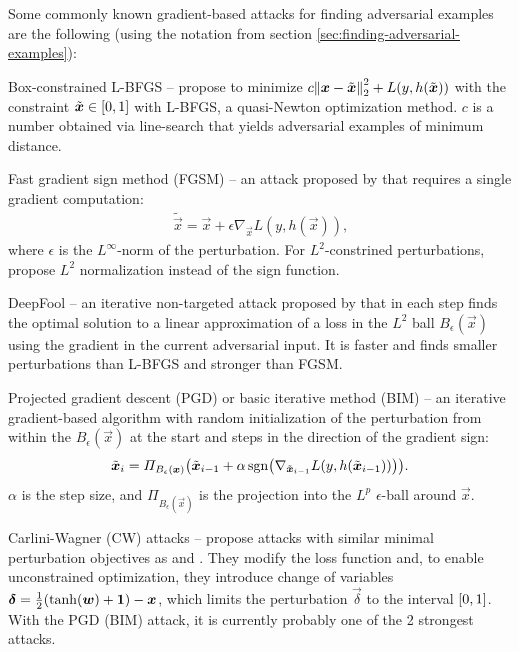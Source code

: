 \documentclass[conference,compsoc]{IEEEtran}
\begin{document}
Some commonly known gradient-based attacks for finding adversarial examples are the following (using the notation from section \ref{sec:finding-adversarial-examples}):
\begin{soliditemize}
	\item Box-constrained L-BFGS -- \citet{Szegedy:2013:IPNN} propose to minimize $c\enVert{\vec x -\tilde{\vec x}}_2^2+L(y,h(\tilde{\vec x}))$ with the constraint $\tilde{\vec x}\in\intcc{0,1}$ with L-BFGS, a quasi-Newton optimization method. $c$ is a number obtained via line-search that yields adversarial examples of minimum distance.
	\item Fast gradient sign method (FGSM) -- an attack proposed by \citet{Goodfellow:2014:EHAE} that requires a single gradient computation:
	\begin{align}
	\tilde{\vec x} = \vec x + \epsilon\nabla_{\vec x} L(y,h(\vec x)) \text{,}
	\end{align} 
	where $\epsilon$ is the $L^\infty$-norm of the perturbation. For $L^2$-constrined perturbations, \citet{Miyato:2017:VATRMSSSL} propose $L^2$ normalization instead of the sign function.
	\item DeepFool -- an iterative non-targeted attack proposed by \citet{Moosavi-Dezfooli:2016:DFSAMFDNN} that in each step finds the optimal solution to a linear approximation of a loss in the $L^2$ ball $B_\epsilon(\vec x)$ using the gradient in the current adversarial input. It is faster and finds smaller perturbations than L-BFGS and stronger than FGSM.
	\item Projected gradient descent (PGD) \citep{Madry:2017:TDLMRAA} or basic iterative method (BIM) \citep{Kurakin:2016:AEPW} -- an iterative gradient-based algorithm with random initialization \citep{Madry:2017:TDLMRAA} of the perturbation from within the $B_\epsilon(\vec x)$ at the start and steps in the direction of the gradient sign:
	\begin{equation} \label{eq:pgd}
	\tilde{\vec x}_i = \Pi_{B_\epsilon(\vec x)} \del{\tilde{\vec x}_{i-1} + \alpha\sgn\del{\nabla_{\tilde{\vec x}_{i-1}} L(y,h(\tilde{\vec x}_{i-1}))}} \text{.}
	\end{equation}
	$\alpha$ is the step size, and $\Pi_{B_\epsilon(\vec x)}$ is the projection into the $L^p$ $\epsilon$-ball around $\vec x$.
	\item Carlini-Wagner (CW) attacks -- \citet{Carlini:2017:TERNN} propose attacks with similar minimal perturbation objectives as \citet{Szegedy:2013:IPNN} and \citet{Moosavi-Dezfooli:2016:DFSAMFDNN}. They modify the loss function and, to enable unconstrained optimization, they introduce change of variables $\vec\delta=\frac{1}{2}\del{\tanh\del{\vec w} + \cvec 1} - \vec x$, which limits the perturbation $\vec\delta$ to the interval $\intcc{0,1}$. With the PGD (BIM) attack, it is currently probably one of the 2 strongest attacks.
\end{soliditemize}
\end{document}

